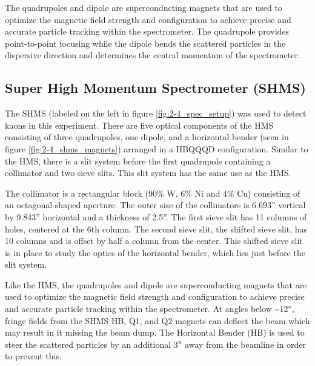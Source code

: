 \documentclass[
]{report}
\begin{document}


The quadrupoles and dipole are superconducting magnets that are used to
optimize the magnetic field strength and configuration to achieve
precise and accurate particle tracking within the spectrometer. The
quadrupole provides point-to-point focusing while the dipole bends the
scattered particles in the dispersive direction and determines the
central momentum of the spectrometer.

\hypertarget{super-high-momentum-spectrometer-shms}{%
\subsection{Super High Momentum Spectrometer
(SHMS)}\label{super-high-momentum-spectrometer-shms}}

The SHMS (labeled on the left in figure \ref{fig:2-4_spec_setup}) was
used to detect kaons in this experiment. There are five optical
components of the HMS consisting of three quadrupoles, one dipole, and a
horizontal bender (seen in figure \ref{fig:2-4_shms_magnets}) arranged
in a HBQQQD configuration. Similar to the HMS, there is a slit system
before the first quadrupole containing a collimator and two sieve slits.
This slit system has the same use as the HMS.



The collimator is a rectangular block (90\% W, 6\% Ni and 4\% Cu)
consisting of an octagonal-shaped aperture. The outer size of the
collimators is 6.693'' vertical by 9.843'' horizontal and a thickness of
2.5''. The first sieve slit has 11 columns of holes, centered at the 6th
column. The second sieve slit, the shifted sieve slit, has 10 columns
and is offset by half a column from the center. This shifted sieve slit
is in place to study the optics of the horizontal bender, which lies
just before the slit system.



Like the HMS, the quadrupoles and dipole are superconducting magnets
that are used to optimize the magnetic field strength and configuration
to achieve precise and accurate particle tracking within the
spectrometer. At angles below \textasciitilde12\(\degree\), fringe
fields from the SHMS HB, Q1, and Q2 magnets can deflect the beam which
may result in it missing the beam dump. The Horizontal Bender (HB) is
used to steer the scattered particles by an additional 3\(\degree\) away
from the beamline in order to prevent this.
\end{document}
